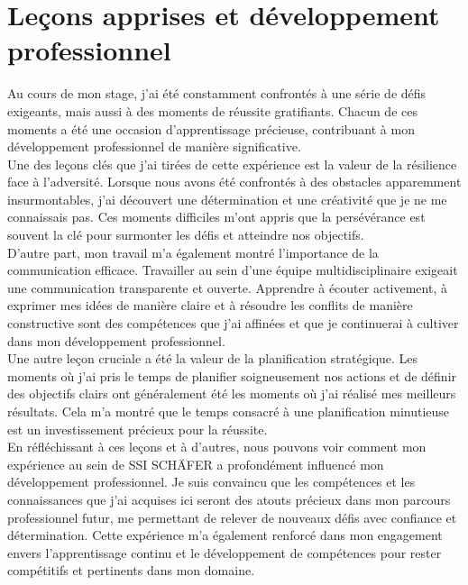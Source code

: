 \documentclass[a4paper, 12pt, french]{article}
\begin{document}
			\section{Leçons apprises et développement professionnel}
				Au cours de mon stage, j'ai été constamment confrontés à une série de défis exigeants, mais aussi à des moments de réussite gratifiants. Chacun de ces moments a été une occasion d'apprentissage précieuse, contribuant à mon développement professionnel de manière significative.\\

			Une des leçons clés que j'ai tirées de cette expérience est la valeur de la résilience face à l'adversité. Lorsque nous avons été confrontés à des obstacles apparemment insurmontables, j'ai découvert une détermination et une créativité que je ne me connaissais pas. Ces moments difficiles m'ont appris que la persévérance est souvent la clé pour surmonter les défis et atteindre nos objectifs.\\

			D'autre part, mon travail m'a également montré l'importance de la communication efficace. Travailler au sein d'une équipe multidisciplinaire exigeait une communication transparente et ouverte. Apprendre à écouter activement, à exprimer mes idées de manière claire et à résoudre les conflits de manière constructive sont des compétences que j'ai affinées et que je continuerai à cultiver dans mon développement professionnel.\\

			Une autre leçon cruciale a été la valeur de la planification stratégique. Les moments où j'ai pris le temps de planifier soigneusement nos actions et de définir des objectifs clairs ont généralement été les moments où j'ai réalisé mes meilleurs résultats. Cela m'a montré que le temps consacré à une planification minutieuse est un investissement précieux pour la réussite.\\

			En réfléchissant à ces leçons et à d'autres, nous pouvons voir comment mon expérience au sein de SSI SCHÄFER a profondément influencé mon développement professionnel. Je suis convaincu que les compétences et les connaissances que j'ai acquises ici seront des atouts précieux dans mon parcours professionnel futur, me permettant de relever de nouveaux défis avec confiance et détermination. Cette expérience m'a également renforcé dans mon engagement envers l'apprentissage continu et le développement de compétences pour rester compétitifs et pertinents dans mon domaine.
	\newpage
\end{document}
